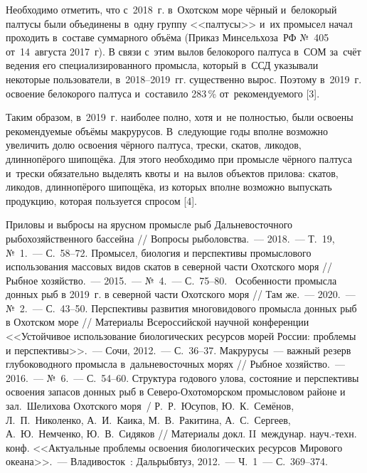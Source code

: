 Необходимо отметить, что с~2018~г. в~Охотском море чёрный и~белокорый палтусы были объединены в~одну группу <<палтусы>> и~их промысел начал проходить в~составе суммарного объёма (Приказ Минсельхоза~РФ №~405 от~14~августа 2017~г). В связи с~этим вылов белокорого палтуса в~СОМ за~счёт ведения его специализированного промысла, который в~ССД указывали некоторые пользователи, в~2018--2019~гг. существенно вырос. Поэтому в~2019~г. освоение белокорого палтуса и~составило 283\,\% от~рекомендуемого [3].

Таким образом, в~2019~г. наиболее полно, хотя и~не полностью, были освоены рекомендуемые объёмы макрурусов. В~следующие годы вполне возможно увеличить долю освоения чёрного палтуса, трески, скатов, ликодов, длиннопёрого шипощёка. Для этого необходимо при промысле чёрного палтуса и~трески обязательно выделять квоты и~на вылов объектов прилова: скатов, ликодов, длиннопёрого шипощёка, из которых вполне возможно выпускать продукцию, которая пользуется спросом [4].

\begin{thebibliography}{99}

\bibitem{}
 Приловы и выбросы на ярусном промысле рыб Дальневосточного рыбохозяйственного бассейна // Вопросы рыболовства.~--- 2018.~--- Т.~19, №~1.~--- С.~58--72.
\bibitem{}
 Промысел, биология и перспективы промыслового использования массовых видов скатов в северной части Охотского моря // Рыбное хозяйство.~--- 2015.~--- №~4.~--- С.~75--80.
\bibitem{}
 Особенности промысла донных рыб в 2019~г. в северной части Охотского моря // Там же.~--- 2020.~--- №~2.~--- С.~43--50.
\bibitem{}
 Перспективы развития многовидового промысла донных рыб в Охотском море // Материалы Всероссийской научной конференции <<Устойчивое использование биологических ресурсов морей России: проблемы и перспективы>>.~--- Сочи, 2012.~--- С.~36--37.
\bibitem{}
 Макрурусы~--- важный резерв глубоководного промысла в~дальневосточных морях // Рыбное хозяйство.~--- 2016.~--- №~6.~--- С.~54--60.
\bibitem{}
 Структура годового улова, состояние и перспективы освоения запасов донных рыб в Северо-Охотоморском промысловом районе и зал.~Шелихова Охотского моря~/ Р.~Р.~Юсупов, Ю.~К.~Семёнов, Л.~П.~Николенко, А.~И.~Каика, М.~В.~Ракитина, А.~С.~Сергеев, А.~Ю.~Немченко, Ю.~В.~Сидяков // Материалы докл. II~междунар. науч.-техн. конф. <<Актуальные проблемы освоения биологических ресурсов Мирового океана>>.~--- Владивосток~: Дальрыбвтуз, 2012.~--- Ч.~1~--- С.~369--374.
\end{thebibliography}
